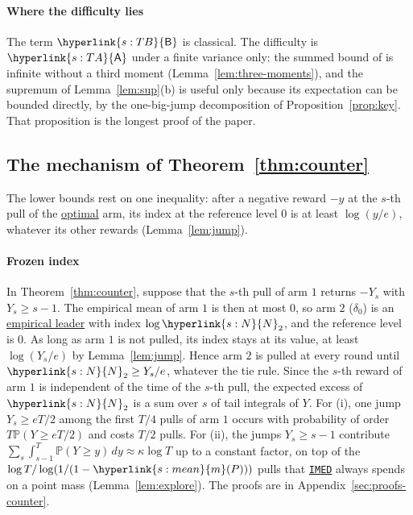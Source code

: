 \documentclass[11pt]{article}
\newcommand{\Prob}{\mathbb{P}}
\newcommand{\sy}[2]{{\hyperlink{#1}{#2}}}
\newcommand{\term}[2]{\hyperlink{#1}{#2}}
\newcommand{\imed}{\hyperref[alg:imed]{\texttt{IMED}}}
\newcommand{\mean}{\sy{s:mean}{m}}
\newcommand{\Np}{\sy{s:N}{N}}
\newcommand{\TA}{\sy{s:TA}{\mathsf{A}}}
\newcommand{\TB}{\sy{s:TB}{\mathsf{B}}}
\begin{document}
\paragraph{Where the difficulty lies} The term $\TB$ is classical. The difficulty is $\TA$ under a
finite variance only: the summed bound of \citet{HT15} is infinite without a third moment
(Lemma~\ref{lem:three-moments}), and the supremum of Lemma~\ref{lem:sup}(b) is useful only
because its expectation can be bounded directly, by the one-big-jump decomposition of
Proposition~\ref{prop:key}. That proposition is the longest proof of the paper.

\subsection{The mechanism of Theorem~\ref{thm:counter}}\label{sec:overview-counter}

The lower bounds rest on one inequality: after a negative reward $-y$ at the $s$-th pull of the
\term{w:optimal}{optimal} arm, its index at the reference level $0$ is at least $\log(y/e)$, whatever its other
rewards (Lemma~\ref{lem:jump}).

\paragraph{Frozen index} In Theorem~\ref{thm:counter}, suppose that the $s$-th pull of arm $1$
returns $-Y_s$ with $Y_s\ge s-1$. The empirical mean of arm $1$ is then at most $0$, so arm $2$
($\delta_0$) is an \term{w:leader}{empirical leader} with index $\log \Np_2$, and the reference level is $0$. As long
as arm $1$ is not pulled, its index stays at its value, at least $\log(Y_s/e)$ by
Lemma~\ref{lem:jump}. Hence arm $2$ is pulled at every round until $\Np_2\ge Y_s/e$, whatever the tie
rule. Since the $s$-th reward of arm $1$ is independent of the time of the $s$-th pull, the
expected excess of $\Np_2$ is a sum over $s$ of tail integrals of $Y$. For (i), one jump $Y_s\ge eT/2$
among the first $T/4$ pulls of arm $1$ occurs with probability of order $T\Prob(Y\ge eT/2)$ and
costs $T/2$ pulls. For (ii), the jumps $Y_s\ge s-1$ contribute
$\sum_s\int_{s-1}^{T}\Prob(Y\ge y)\,dy\approx\kappa\log T$ up to a constant factor, on top of the
$\log T/\log(1/(1-\mean(P)))$ pulls that \imed{} always spends on a point mass (Lemma~\ref{lem:explore}).
The proofs are in Appendix~\ref{sec:proofs-counter}.
\end{document}
